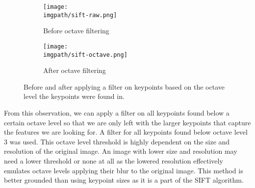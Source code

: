 \begin{figure}[H]
	\begin{subfigure}{0.5\textwidth}
	\texttt{[image: \\imgpath/sift-raw.png]}
	\caption{Before octave filtering}
	\end{subfigure}
	\hspace*{\fill}
	\begin{subfigure}{0.5\textwidth}
	\texttt{[image: \\imgpath/sift-octave.png]}
	\caption{After octave filtering}
	\end{subfigure}
\caption{Before and after applying a filter on keypoints based on the octave level the keypoints were found in.}
\end{figure}
\noindent
From this observation, we can apply a filter on all keypoints found below a certain octave level so that we are only left with the larger keypoints that capture the features we are looking for. A filter for all keypoints found below octave level 3 was used. This octave level threshold is highly dependent on the size and resolution of the original image. An image with lower size and resolution may need a lower threshold or none at all as the lowered resolution effectively emulates octave levels applying their blur to the original image. This method is better grounded than using keypoint sizes as it is a part of the SIFT algorithm.


